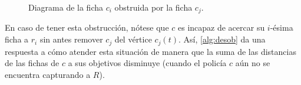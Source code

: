 \begin{figure}[h]
    \centering
    \caption{Diagrama de la ficha $c_i$ obstruida por la ficha $c_j$.}
    \label{fig:obstruccion}
\end{figure}

En caso de tener esta obstrucci\'on, n\'otese que $c$ es incapaz de acercar su
$i$-\'esima ficha a $r_i$ sin antes remover $c_j$ del v\'ertice $c_j(t)$. As\'i,
\cref{alg:desob} da una respuesta a c\'omo atender esta situaci\'on de manera
que la suma de las distancias de las fichas de $c$ a sus objetivos disminuye
(cuando el polic\'ia $c$ a\'un no se encuentra capturando a $R$).

\pagebreak

